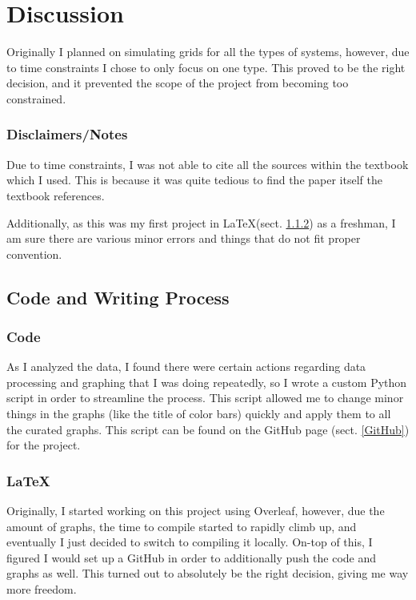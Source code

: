 \documentclass[12pt, a4paper]{article}
\begin{document}
\section{\centering Discussion}   
    Originally I planned on simulating grids for all the types of systems, however, due to time constraints I chose to only focus on one type. This proved to be the right decision, and it prevented the scope of the project from becoming too constrained.

    \subsubsection{Disclaimers/Notes}
        Due to time constraints, I was not able to cite all the sources within the textbook \parencite{TaurisvandenHeuvel+2023} which I used. This is because it was quite tedious to find the paper itself the textbook references. 

        Additionally, as this was my first project in \LaTeX (sect. \ref{LaTeX}) as a freshman, I am sure there are various minor errors and things that do not fit proper convention. 

    \subsection{Code and Writing Process}
        \subsubsection{Code}

            As I analyzed the data, I found there were certain actions regarding data processing and graphing that I was doing repeatedly, so I wrote a custom Python script in order to streamline the process. This script allowed me to change minor things in the graphs (like the title of color bars) quickly and apply them to all the curated graphs. This script can be found on the GitHub page (sect. \ref{GitHub}) for the project. 

        \subsubsection{\LaTeX} \label{LaTeX}
        
            Originally, I started working on this project using Overleaf, however, due the amount of graphs, the time to compile started to rapidly climb up, and eventually I just decided to switch to compiling it locally. On-top of this, I figured I would set up a GitHub in order to additionally push the code and graphs as well. This turned out to absolutely be the right decision, giving me way more freedom.
\end{document}
